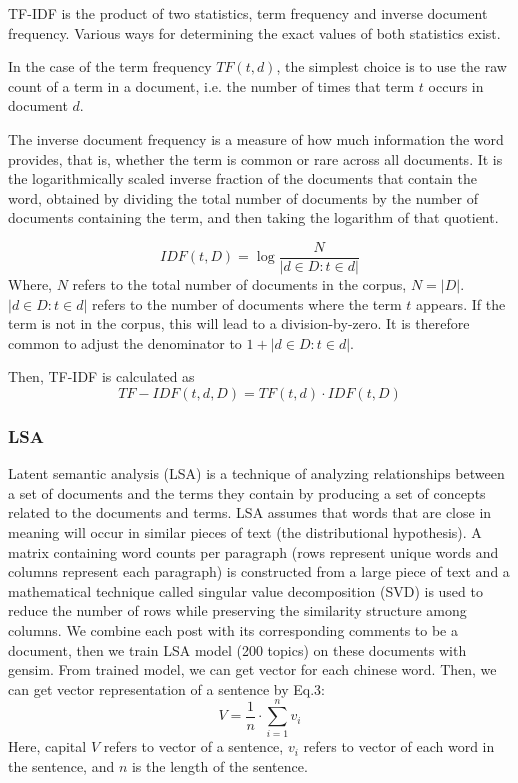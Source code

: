 \documentclass{sig-alternate}
\begin{document}
TF-IDF is the product of two statistics, term frequency and inverse document frequency. Various ways for determining the exact values of both statistics exist.

In the case of the term frequency $TF(t,d)$, the simplest choice is to use the raw count of a term in a document, i.e. the number of times that term $t$ 
occurs in document $d$. 

The inverse document frequency is a measure of how much information the word provides, that is, whether the term is common or rare across all documents. It is the logarithmically scaled inverse fraction of the documents that contain the word, obtained by dividing the total number of documents by the number of documents containing the term, and then taking the logarithm of that quotient.

\begin{equation}
IDF(t, D) = \log{\frac{N}{|{d \in D: t \in d}|}}
\end{equation}
Where, $N$ refers to the total number of documents in the corpus, $N = |D|$. $|{d \in D: t \in d}|$ refers to the number of documents where the term $t$ appears. If the term is not in the corpus, this will lead to a division-by-zero. It is therefore common to adjust the denominator to $1 + |{d \in D: t \in d}|$.

Then, TF-IDF is calculated as
\begin{equation}
TF-IDF(t,d,D) = TF(t,d) \cdot IDF(t, D)
\end{equation}

\subsubsection{LSA}
Latent semantic analysis (LSA) is a technique of analyzing relationships between a set of documents and the terms they contain by producing a set of concepts related to the documents and terms. LSA assumes that words that are close in meaning will occur in similar pieces of text (the distributional hypothesis). A matrix containing word counts per paragraph (rows represent unique words and columns represent each paragraph) is constructed from a large piece of text and a mathematical technique called singular value decomposition (SVD) is used to reduce the number of rows while preserving the similarity structure among columns.\cite{Susan} We combine each post with its corresponding comments to be a document, then we train LSA model (200 topics) on these documents with gensim\footnotemark. From trained model, we can get vector for each chinese word.
Then, we can get vector representation of a sentence by Eq.3:
\begin{equation}
   V = \frac{1}{n} \cdot \sum_{i=1}^n v_i 
\end{equation}
Here, capital $V$ refers to vector of a sentence, $v_i$ refers to vector of each word in the sentence, and $n$ is the length of the sentence.
\end{document}
